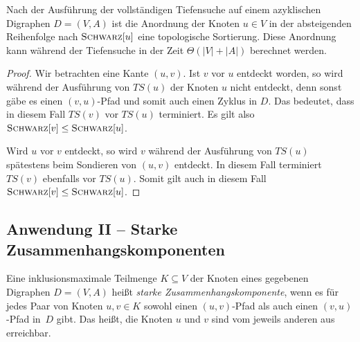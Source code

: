 \begin{thm}
	Nach der Ausführung der vollständigen Tiefensuche auf einem azyklischen Digraphen $D=(V,A)$ ist die Anordnung der Knoten $u \in V$ in der absteigenden Reihenfolge nach $\mathop{\text{\textsc{Schwarz}}}[u]$ eine topologische Sortierung. Diese Anordnung kann während der Tiefensuche in der Zeit $\Theta(|V|+|A|)$ berechnet werden. 
\end{thm}

\begin{proof}
	Wir betrachten eine Kante $(u,v)$. Ist $v$ vor $u$ entdeckt worden, so wird während der Ausführung von $TS(u)$ der Knoten $u$ nicht entdeckt, denn sonst gäbe es einen $(v,u)$-Pfad und somit auch einen Zyklus in $D$. Das bedeutet, dass in diesem Fall $TS(v)$ vor $TS(u)$ terminiert. Es gilt also $\mathop{\text{\textsc{Schwarz}}}[v] \le \mathop{\text{\textsc{Schwarz}}}[u]$. 
	
	Wird $u$ vor $v$ entdeckt, so wird $v$ während der Ausführung von $TS(u)$ spätestens beim Sondieren von $(u,v)$ entdeckt. In diesem Fall terminiert $TS(v)$ ebenfalls vor $TS(u)$. Somit gilt auch in diesem Fall $\mathop{\text{\textsc{Schwarz}}}[v] \le \mathop{\text{\textsc{Schwarz}}}[u]$.
\end{proof}




\subsection{Anwendung II -- Starke Zusammenhangskomponenten}

\begin{defn}
Eine inklusionsmaximale Teilmenge $K \subseteq V$ der Knoten eines gegebenen Digraphen $D=(V,A)$ heißt \emph{starke Zusammenhangskomponente}, wenn es für jedes Paar von Knoten $u,v \in K$ sowohl einen $(u,v)$-Pfad als auch einen $(v,u)$-Pfad in~$D$ gibt.
Das heißt, die Knoten $u$ und $v$ sind vom jeweils anderen aus erreichbar.
\end{defn} 


